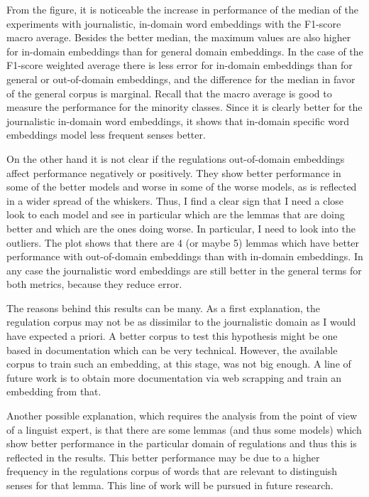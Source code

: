 From the figure, it is noticeable the increase in performance of the median of
the experiments with journalistic, in-domain word embeddings with the F1-score
macro average. Besides the better median, the maximum values are also higher
for in-domain embeddings than for general domain embeddings. In the case of
the F1-score weighted average there is less error  for in-domain embeddings
than for general or out-of-domain embeddings, and the difference for the median
in favor of the general corpus is marginal. Recall that the macro average is
good to measure the performance for the minority classes. Since it is clearly
better for the journalistic in-domain word embeddings, it shows that in-domain
specific word embeddings model less frequent senses better. 

On the other hand it is not clear if the regulations out-of-domain embeddings
affect performance negatively or positively. They show better performance in
some of the better models and worse in some of the worse models, as is
reflected in a wider spread of the whiskers. Thus, I find a clear sign that I
need a close look to each model and see in particular which are the lemmas that
are doing better and which are the ones doing worse. In particular, I need to
look into the outliers. The plot shows that there are 4 (or maybe 5) lemmas
which have better performance with out-of-domain embeddings than with in-domain
embeddings. In any case the journalistic word embeddings are still better in
the general terms for both metrics, because they reduce error.

The reasons behind this results can be many. As a first explanation, the
regulation corpus may not be as dissimilar to the journalistic domain as I
would have expected a priori. A better corpus to test this hypothesis might be
one based in documentation which can be very technical. However, the available
corpus to train such an embedding, at this stage, was not big enough. A line of
future work is to obtain more documentation via web scrapping and train an
embedding from that.

Another possible explanation, which requires the analysis from the point of
view of a linguist expert, is that there are some lemmas (and thus some models)
which show better performance in the particular domain of regulations and thus
this is reflected in the results. This better performance may be due to a
higher frequency in the regulations corpus of words that are relevant to
distinguish senses for that lemma. This line of work will be pursued in future
research.

